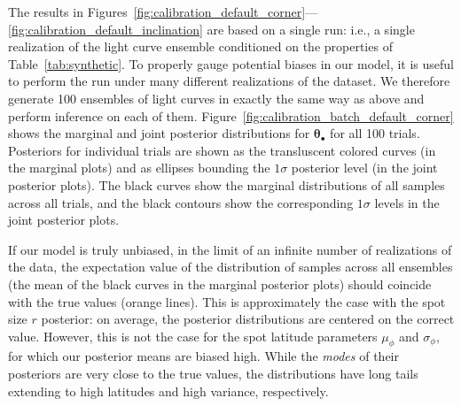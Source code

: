 \documentclass[modern,linenumbers]{aastex62}
\begin{document}
The results in
Figures~\ref{fig:calibration_default_corner}---\ref{fig:calibration_default_inclination}
are based on a single run: i.e., a single realization of the light curve ensemble conditioned on
the properties of Table~\ref{tab:synthetic}. To properly gauge potential biases
in our model, it is useful to perform the run under many different realizations
of the dataset. We therefore generate 100 ensembles of light curves in
exactly the same way as above and perform inference on each of them.
Figure~\ref{fig:calibration_batch_default_corner} shows the marginal and joint
posterior distributions for $\pmb{\theta}_\bullet$ for all 100 trials.
Posteriors for individual trials are shown as the transluscent colored curves
(in the marginal plots) and as ellipses bounding the $1\sigma$ posterior level
(in the joint posterior plots). The black curves show the marginal distributions of all
samples across all trials, and the black contours show the corresponding $1\sigma$
levels in the joint posterior plots.

If our model is truly unbiased, in the limit of an infinite number of realizations
of the data, the expectation value of the distribution
of samples across all ensembles (the mean of the black curves in the marginal
posterior plots) should coincide with the true values (orange lines).
This is approximately
the case with the spot size $r$ posterior: on average, the posterior
distributions are centered on the correct value.
However, this is not the case for
the spot latitude parameters $\mu_\phi$ and $\sigma_\phi$, for which our
posterior means are biased high. While the \emph{modes} of their
posteriors are very close to the true values, the distributions have long
tails extending to high latitudes and high variance, respectively.
\end{document}
